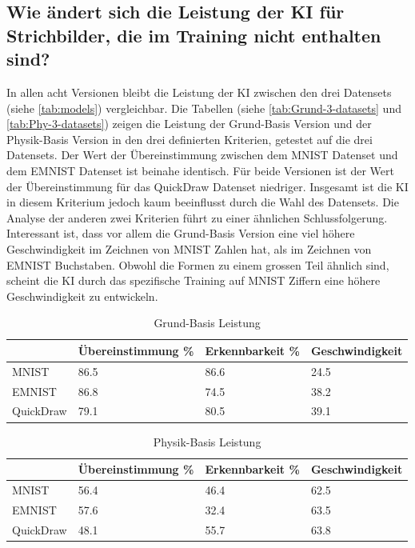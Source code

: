  
\subsection{Wie ändert sich die Leistung der KI für Strichbilder, die im Training nicht enthalten sind?}\label{subsub:d_frage_unter_4}
In allen acht Versionen bleibt die Leistung der KI zwischen den drei Datensets
(siehe \autoref{tab:models}) vergleichbar. Die Tabellen (siehe \autoref{tab:Grund-3-datasets} und \autoref{tab:Phy-3-datasets})
zeigen die Leistung der Grund-Basis Version und der
Physik-Basis Version in den drei definierten Kriterien, getestet auf die drei
Datensets. Der Wert der Übereinstimmung zwischen dem MNIST Datenset und dem
EMNIST Datenset ist beinahe identisch. Für beide Versionen ist der Wert der
Übereinstimmung für das QuickDraw Datenset niedriger. Insgesamt ist die KI in
diesem Kriterium jedoch kaum beeinflusst durch die Wahl des Datensets. Die
Analyse der anderen zwei Kriterien führt zu einer ähnlichen Schlussfolgerung.
Interessant ist, dass vor allem die Grund-Basis Version eine viel höhere
Geschwindigkeit im Zeichnen von MNIST Zahlen hat, als im Zeichnen von EMNIST
Buchstaben. Obwohl die Formen zu einem grossen Teil ähnlich sind, scheint die KI durch
das spezifische Training auf MNIST Ziffern eine höhere Geschwindigkeit zu
entwickeln.
 
\begin{table}[!ht]
   \centering
   \caption{Grund-Basis Leistung}\label{tab:Grund-3-datasets}
   \begin{tabular}{|l|l|l|l|}
       \hline
           ~ & Übereinstimmung \% & Erkennbarkeit \% & Geschwindigkeit \\ \hline
           MNIST & 86.5 & 86.6 & 24.5 \\ \hline
           EMNIST & 86.8 & 74.5 & 38.2 \\ \hline
           QuickDraw & 79.1 & 80.5 & 39.1 \\ \hline 
       \end{tabular}
\end{table}
 
\begin{table}[!ht]
   \centering
   \caption{Physik-Basis Leistung}\label{tab:Phy-3-datasets}
   \begin{tabular}{|l|l|l|l|}
       \hline
           ~ & Übereinstimmung \% & Erkennbarkeit \% & Geschwindigkeit \\ \hline
           MNIST  & 56.4 & 46.4 & 62.5 \\ \hline
           EMNIST & 57.6 & 32.4 & 63.5 \\ \hline
           QuickDraw & 48.1 & 55.7 & 63.8 \\ \hline
       \end{tabular}
\end{table}
 
